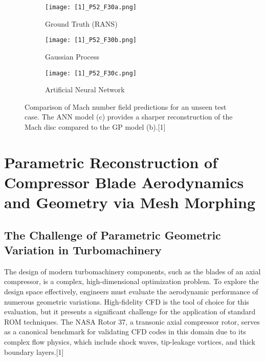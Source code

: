 \documentclass[12pt, a4paper]{report}
\begin{document}
\begin{figure}[h!]
    \centering
    \begin{subfigure}[b]{0.32\textwidth}
        \texttt{[image: [1]\_P52\_F30a.png]}
        \caption{Ground Truth (RANS)}
    \end{subfigure}
    \hfill
    \begin{subfigure}[b]{0.32\textwidth}
        \texttt{[image: [1]\_P52\_F30b.png]}
        \caption{Gaussian Process}
    \end{subfigure}
    \hfill
    \begin{subfigure}[b]{0.32\textwidth}
        \texttt{[image: [1]\_P52\_F30c.png]}
        \caption{Artificial Neural Network}
    \end{subfigure}
    \caption{Comparison of Mach number field predictions for an unseen test case. The ANN model (c) provides a sharper reconstruction of the Mach disc compared to the GP model (b).[1]}
    \label{fig:mach_reconstruction}
\end{figure}

\chapter{Parametric Reconstruction of Compressor Blade Aerodynamics and Geometry via Mesh Morphing}

\section{The Challenge of Parametric Geometric Variation in Turbomachinery}

The design of modern turbomachinery components, such as the blades of an axial compressor, is a complex, high-dimensional optimization problem. To explore the design space effectively, engineers must evaluate the aerodynamic performance of numerous geometric variations. High-fidelity CFD is the tool of choice for this evaluation, but it presents a significant challenge for the application of standard ROM techniques. The NASA Rotor 37, a transonic axial compressor rotor, serves as a canonical benchmark for validating CFD codes in this domain due to its complex flow physics, which include shock waves, tip-leakage vortices, and thick boundary layers.[1]
\end{document}
